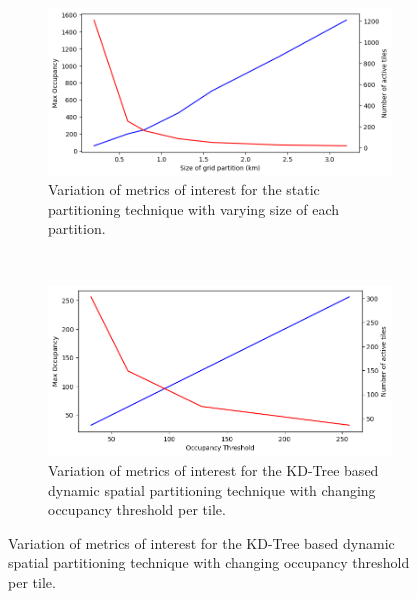 \begin{figure}
\centering
\begin{subfigure}{0.45\textwidth}
  \centering
  \includegraphics[width=\linewidth]{figures/design_space/spatial/metrics_Grid.png}
  \caption{Variation of metrics of interest for the static partitioning technique with varying size of each partition.}
  \label{fig:static_part_metrics}
\end{subfigure}
~~~~
\begin{subfigure}{0.45\textwidth}
  \centering
  \includegraphics[width=\linewidth]{figures/design_space/spatial/metrics_KDTree.png}
  \caption{Variation of metrics of interest for the KD-Tree based dynamic spatial partitioning technique with changing occupancy threshold per tile.}
  \label{fig:kdtree_part_metrics}
\end{subfigure}\par\medskip
\end{figure}

